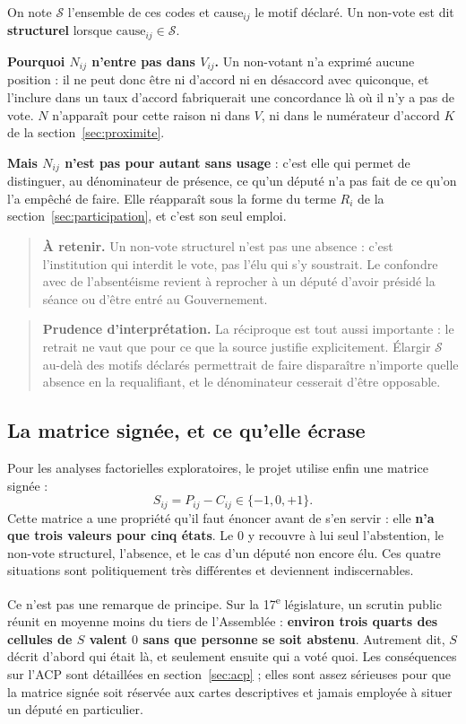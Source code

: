 \documentclass[11pt,a4paper]{article}
\newcommand{\important}[1]{\begin{quote}\small\color{blue!55!black}\textbf{À retenir.} #1\end{quote}}
\newcommand{\prudence}[1]{\begin{quote}\small\color{red!55!black}\textbf{Prudence d'interprétation.} #1\end{quote}}
\begin{document}
On note $\mathcal S$ l'ensemble de ces codes et
$\mathrm{cause}_{ij}$ le motif déclaré. Un non-vote est dit \textbf{structurel}
lorsque $\mathrm{cause}_{ij}\in\mathcal S$.

\textbf{Pourquoi $N_{ij}$ n'entre pas dans $V_{ij}$.} Un non-votant n'a exprimé
aucune position : il ne peut donc être ni d'accord ni en désaccord avec
quiconque, et l'inclure dans un taux d'accord fabriquerait une concordance là
où il n'y a pas de vote. $N$ n'apparaît pour cette raison ni dans $V$, ni dans
le numérateur d'accord $K$ de la section~\ref{sec:proximite}.

\textbf{Mais $N_{ij}$ n'est pas pour autant sans usage} : c'est elle qui permet
de distinguer, au dénominateur de présence, ce qu'un député n'a pas fait de ce
qu'on l'a empêché de faire. Elle réapparaît sous la forme du terme $R_i$ de la
section~\ref{sec:participation}, et c'est son seul emploi.

\important{Un non-vote structurel n'est pas une absence : c'est l'institution
qui interdit le vote, pas l'élu qui s'y soustrait. Le confondre avec de
l'absentéisme revient à reprocher à un député d'avoir présidé la séance ou
d'être entré au Gouvernement.}

\prudence{La réciproque est tout aussi importante : le retrait ne vaut que pour
ce que la source justifie explicitement. Élargir $\mathcal S$ au-delà des motifs
déclarés permettrait de faire disparaître n'importe quelle absence en la
requalifiant, et le dénominateur cesserait d'être opposable.}

\subsection{La matrice signée, et ce qu'elle écrase}
\label{sec:signee}

Pour les analyses factorielles exploratoires, le projet utilise enfin une
matrice signée :
\[
 S_{ij}=P_{ij}-C_{ij}\in\{-1,0,+1\}.
\]
Cette matrice a une propriété qu'il faut énoncer avant de s'en servir : elle
\textbf{n'a que trois valeurs pour cinq états}. Le $0$ y recouvre à lui seul
l'abstention, le non-vote structurel, l'absence, et le cas d'un député non
encore élu. Ces quatre situations sont politiquement très différentes et
deviennent indiscernables.

Ce n'est pas une remarque de principe. Sur la 17\textsuperscript{e}
législature, un scrutin public réunit en moyenne moins du tiers de
l'Assemblée : \textbf{environ trois quarts des cellules de $S$ valent $0$ sans
que personne se soit abstenu}. Autrement dit, $S$ décrit d'abord qui était là,
et seulement ensuite qui a voté quoi. Les conséquences sur l'ACP sont détaillées
en section~\ref{sec:acp} ; elles sont assez sérieuses pour que la matrice signée
soit réservée aux cartes descriptives et jamais employée à situer un député en
particulier.
\end{document}
